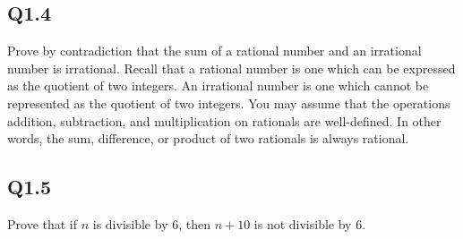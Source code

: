 \documentclass{article}
\begin{document}
\subsection*{Q1.4}
Prove by contradiction that the sum of a rational number and an irrational number is irrational. Recall that a rational number is one
which can be expressed as the quotient of two integers. An irrational number is one which cannot be represented as the quotient of two integers.
You may assume that the operations addition, subtraction, and multiplication on rationals are well-defined. In other words, the sum, difference, or
product of two rationals is always rational.
\newpage

\subsection*{Q1.5}
Prove that if $n$ is divisible by 6, then $n+10$ is not divisible by 6.
\newpage
\end{document}
